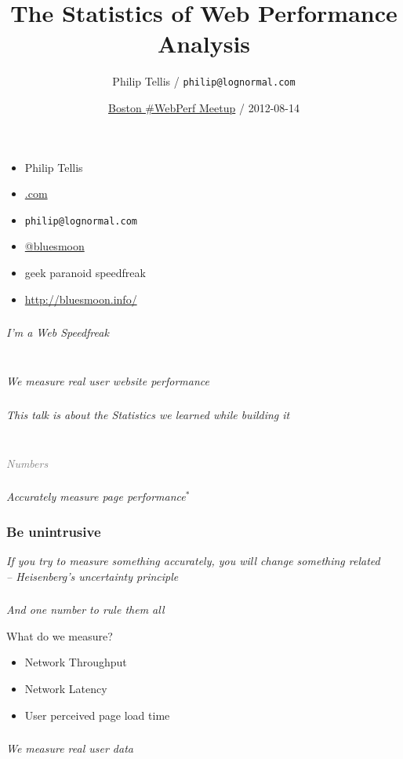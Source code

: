 \documentclass{beamer}
\author{Philip Tellis / \texttt{philip@lognormal.com}}
\title{The Statistics of Web Performance Analysis}
\date{\href{http://www.meetup.com/Web-Performance-Boston/events/75714302/}{Boston \#WebPerf Meetup} / 2012-08-14}
\newcommand{\innersplash}[1]{
  \begin{center}
    \large \textrm{\textit{ #1 } }
  \end{center}
}
\newcommand{\splashslide}[2][{}]{
  \begin{frame}
  \frametitle{#1}
  \innersplash{#2}
  \end{frame}
}
\newcommand{\leadinslide}[2]{
  \splashslide{
     {\fontsize{150}{20}\selectfont{\raisebox{0pt}[90pt][0pt]{\textcolor{light-gray}{#1}}}} \\ \huge \textcolor{gray}{#2}
  }
}
\begin{document}
\begin{frame}
  \begin{itemize}
  \item Philip Tellis
  \item \href{http://www.lognormal.com/}{\textrm{\textcolor{med-gray}{.com}}}
  \item \small{\texttt{philip@lognormal.com}}
  \item \href{http://twitter.com/bluesmoon}{@bluesmoon}
  \item geek paranoid speedfreak
  \item \href{http://bluesmoon.info/}{http://bluesmoon.info/}
  \end{itemize}
\end{frame}

\splashslide{I'm a Web Speedfreak}

\splashslide{ \\ We measure real user website performance}

\splashslide{This talk is about the Statistics we learned while building it}

\begin{frame}
  \titlepage
\end{frame}

\leadinslide{0}{Numbers}

\splashslide{Accurately measure page performance$^{*}$}

\splashslide[Be unintrusive]{If you try to measure something accurately, you will change something related \\ \hfill \tiny{-- Heisenberg's uncertainty principle}}

\splashslide{And one number to rule them all}

\begin{frame}{What do we measure?}
  \begin{itemize}
  \item Network Throughput
  \item Network Latency
  \item User perceived page load time
  \end{itemize}
\end{frame}

\splashslide{We measure real user data}
\end{document}

